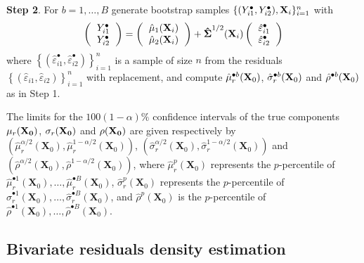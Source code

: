 \noindent
\textbf{Step 2}. For $b=1,\ldots,B$ generate bootstrap samples $\{(Y_{i1}^\bullet,Y_{i2}^\bullet),{\bf X}_i\}_{i=1}^n$ with
\begin{equation}
\left( {
	\begin{tabular} {c}
	$Y_{i1}^\bullet$ \\
	$Y_{i2}^\bullet$ \\
	\end{tabular}}\right) = \left( {
	\begin{tabular} {c}
	$\hat \mu_1(\textbf{X}_i)$ \\
	$\hat \mu_2(\textbf{X}_i)$\
	\end{tabular}
}\right)
+  \boldsymbol{\hat \Sigma}^{1/2} (\textbf{X}_i)
\left( {
	\begin{tabular} {c}
	$\hat \varepsilon_{i1}^\bullet$ \\
	$\hat \varepsilon_{i2}^\bullet$\\
	\end{tabular}
}\right)
\label{boot}
\end{equation}
\noindent
where $\left \{ {(\hat{\varepsilon}_{i1}^\bullet,\hat{\varepsilon}_{i2}^\bullet)}\right\}_{i=1}^n$ is a sample of size $n$ from the residuals
$\left \{ {(\hat{\varepsilon}_{i1},\hat{\varepsilon}_{i2})}\right\}_{i=1}^n$ with replacement, and compute $\hat{\mu}_r^{\bullet b}({\bf X}_0)$, $\hat{\sigma}_{r}^{\bullet b}({\bf X}_0)$ and $\hat{\rho}^{\bullet b}({\bf X}_0)$ as in Step 1.

The limits for the $100(1-\alpha)\%$ confidence intervals of the true components ${\mu}_r(\bf X_0)$, ${\sigma}_r(\bf X_0)$ and  $\rho(\bf X_0)$ are given respectively by $\left({\hat {\mu}^{\alpha/2}_r( \textbf{X}_0), \hat {\mu}^{1-\alpha/2}_r(\textbf{X}_0)}\right)$, $\left({\hat {\sigma}^{\alpha/2}_r(\textbf{X}_0), \hat {\sigma}^{1-\alpha/2}_r(\textbf{X}_0)}\right)$  and   $\left({\hat {\rho}^{\alpha/2}(\textbf{X}_0), \hat {\rho}^{1-\alpha/2}(\textbf{X}_0)}\right)$, where $\hat {\mu}_r^p(\textbf{X}_0)$ represents the $p$-percentile of $\hat{\mu}_r^{\bullet 1}(\textbf{X}_0), \ldots, \hat{\mu}_r^{\bullet B}(\textbf{X}_0)$,  $\hat {\sigma}_r^p(\textbf{X}_0)$ represents the $p$-percentile of $\hat{\sigma}_r^{\bullet 1}(\textbf{X}_0), \ldots, \hat{\sigma}_r^{\bullet B}(\textbf{X}_0)$, and $\hat {\rho}^p(\textbf{X}_0)$  is the $p$-percentile of $\hat{\rho}^{\bullet 1}(\textbf{X}_0), \ldots, \hat{\rho}^{\bullet B}(\textbf{X}_0)$.


\subsection{Bivariate residuals density estimation}

